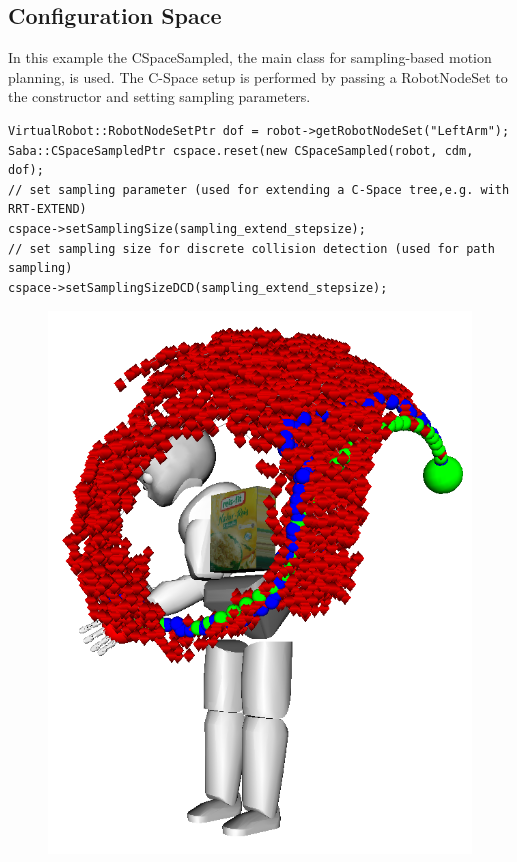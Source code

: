 \documentclass{book}
\begin{document}
\subsection{Configuration Space}
In this example the CSpaceSampled, the main class for sampling-based motion planning, is used. The C-Space setup is performed by passing a RobotNodeSet to the constructor and setting sampling parameters. 
\begin{lstlisting}
VirtualRobot::RobotNodeSetPtr dof = robot->getRobotNodeSet("LeftArm");
Saba::CSpaceSampledPtr cspace.reset(new CSpaceSampled(robot, cdm, dof);
// set sampling parameter (used for extending a C-Space tree,e.g. with RRT-EXTEND)
cspace->setSamplingSize(sampling_extend_stepsize);
// set sampling size for discrete collision detection (used for path sampling)
cspace->setSamplingSizeDCD(sampling_extend_stepsize);
\end{lstlisting}
\begin{figure}[H]
	\centering
	\includegraphics[scale = 0.3]{PlanningBiRrt_ext_ext}
\end{figure}
\end{document}
